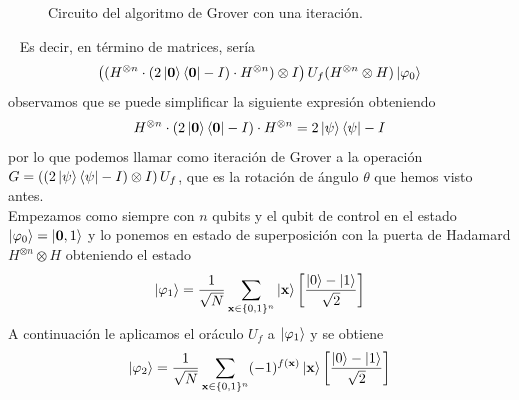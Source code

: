 \documentclass[a4paper]{article}
\numberwithin{equation}{section}
\begin{document}
\begin{figure}[h]
\centering
{}
\caption{Circuito del algoritmo de Grover con una iteración.}
\end{figure}\ \linebreak
Es decir, en término de matrices, sería
\begin{equation}
\left((H^{\otimes n} \cdot (2\ket{\mathbf{0}}\bra{\mathbf{0}} - I) \cdot H^{\otimes n}) \otimes I \right) U_f(H^{\otimes n}\otimes H)\ket{\varphi_0}
\end{equation}
observamos que se puede simplificar la siguiente expresión obteniendo
\begin{equation}
H^{\otimes n} \cdot (2\ket{\mathbf{0}}\bra{\mathbf{0}} - I) \cdot H^{\otimes n} = 2\ket{\psi}\bra{\psi} - I
\end{equation}
por lo que podemos llamar como iteración de Grover a la operación $G = \left( (2\ket{\psi}\bra{\psi} - I) \otimes I\right) U_f$, que es la rotación de ángulo $\theta$ que hemos visto antes.\\
Empezamos como siempre con $n$ qubits y el qubit de control en el estado $\ket{\varphi_0} = \ket{\mathbf{0}, 1}$ y lo ponemos en estado de superposición con la puerta de Hadamard $H^{\otimes n}\otimes H$ obteniendo el estado
\begin{equation}
\ket{\varphi_1} = \frac{1}{\sqrt{N}}\sum_{\mathbf{x}\in\{ 0, 1\}^n}\ket{\mathbf{x}} \left[ \frac{\ket{0} - \ket{1}}{\sqrt{2}} \right]
\end{equation}
A continuación le aplicamos el oráculo $U_f$ a $\ket{\varphi_1}$ y se obtiene
\begin{equation}
\ket{\varphi_2} = \frac{1}{\sqrt{N}} \sum_{\mathbf{x}\in\{ 0, 1\}^n} (-1)^{f(\mathbf{x})} \ket{\mathbf{x}} \left[ \frac{\ket{0} - \ket{1}}{\sqrt{2}} \right]
\end{equation}
\end{document}
